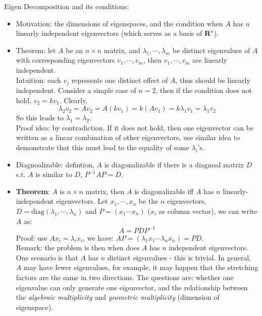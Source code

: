 \documentclass{report}
\begin{document}
Eigen Decomposition and its conditions: 
\begin{itemize}
	\item Motivation: the dimensions of eigenspaces, and the condition when $A$ has $n$ linearly independent eigenvectors (which serves as a basis of $\mathbf{R}^n$). 
	
	\item Theorem: let $A$ be an $n \times n$ matrix, and $\lambda_1, \cdots, \lambda_m$ be distinct eigenvalues of $A$ with corresponding eigenvectors $v_1, \cdots, v_m$, then $v_1, \cdots, v_m$ are linearly independent. \\
	Intuition: each $v_j$ represents one distinct effect of $A$, thus should be linearly independent. Consider a simple case of $n = 2$, then if the condition does not hold, $v_2 = k v_1$. Clearly, 
	\begin{equation}
	\lambda_2 v_2 = A v_2 = A (k v_1) = k (A v_1) = k \lambda_1 v_1 = \lambda_1 v_2
	\end{equation}
	So this leads to $\lambda_1 = \lambda_2$. \\
	Proof idea: by contradiction. If it does not hold, then one eigenvector can be written as a linear combination of other eigenvectors, use similar idea to demonstrate that this must lead to the equality of some $\lambda_i$'s. 
	
	\item Diagnoalizable: defintion, $A$ is diagonalizable if there is a diagnoal matrix $D$ s.t. $A$ is similar to $D$, $P^{-1} A P = D$. 
	
	\item \textbf{Theorem}: $A$ is $n \times n$ matrix, then $A$ is diagonalizable iff $A$ has $n$ linearly-independent eigenvectors. Let $x_1, \cdots, x_n$ be the $n$ eigenvectors, $D = \text{diag}(\lambda_1, \cdots, \lambda_n)$ and $P = (x_1 \cdots x_n)$ ($x_i$ as column vector), we can write $A$ as: 
	\begin{equation}
	A = P D P^{-1}	
	\end{equation}
	Proof: use $A x_i = \lambda_i x_i$, we have: $AP = (\lambda_1 x_1 \cdots \lambda_n x_n) = PD$. \\
	Remark: the problem is then when does $A$ has $n$ independent eigenvectors. One scenario is that $A$ has $n$ distinct eigenvalues - this is trivial. In general, $A$ may have fewer eigenvalues, for example, it may happen that the stretching factors are the same in two directions. The questions are: whether one eigenvalue can only generate one eigenvector, and the relationship between the \textit{algebraic multiplicity} and \textit{geometric multiplicity} (dimension of eigenspace). 
	

\end{itemize}
\end{document}
